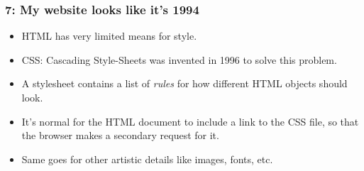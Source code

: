 \documentclass{beamer}
\begin{document}
\begin{frame}
  \frametitle{7: My website looks like it's 1994}

  \begin{itemize}
  \item HTML has very limited means for style.
  \item CSS: Cascading Style-Sheets was invented in 1996 to solve this problem.
  \item A stylesheet contains a list of \emph{rules} for how different
    HTML objects should look.
  \item It's normal for the HTML document to include a link to the CSS
    file, so that the browser makes a secondary request for it.
  \item Same goes for other artistic details like images, fonts, etc.
  \end{itemize}
\end{frame}
\end{document}
